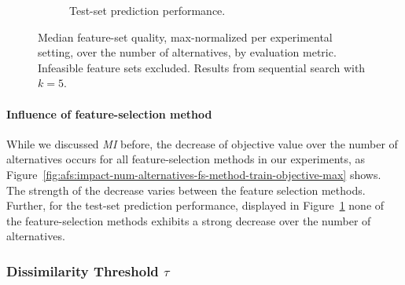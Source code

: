 \documentclass{article}
\theoremstyle{definition}
\begin{document}
\begin{figure}[htb]
\begin{subfigure}[t]{0.48\textwidth}
		\caption{Test-set prediction performance.}
		\label{fig:afs:impact-num-alternatives-fs-method-decision-tree-test-mcc-max}
	\end{subfigure}
	\caption{
		Median feature-set quality, max-normalized per experimental setting, over the number of alternatives, by evaluation metric.
		Infeasible feature sets excluded.
		Results from sequential search with $k=5$.
	}
	\label{fig:afs:impact-num-alternatives-fs-method}
\end{figure}

\paragraph{Influence of feature-selection method}

While we discussed \emph{MI} before, the decrease of objective value over the number of alternatives occurs for all feature-selection methods in our experiments, as Figure~\ref{fig:afs:impact-num-alternatives-fs-method-train-objective-max} shows.
The strength of the decrease varies between the feature selection methods.
Further, for the test-set prediction performance, displayed in Figure~\ref{fig:afs:impact-num-alternatives-fs-method-decision-tree-test-mcc-max} none of the feature-selection methods exhibits a strong decrease over the number of alternatives.

\subsubsection{Dissimilarity Threshold \texorpdfstring{$\tau$}{}} %
\label{sec:afs:evaluation:search:tau}
\end{document}
